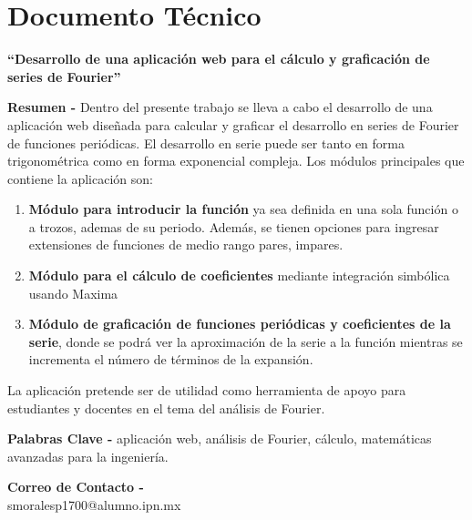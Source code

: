\chapter{Documento Técnico}
\begin{center}
	\textbf{\Large “Desarrollo de una aplicación web para el cálculo y graficación de series de Fourier”}
	\vspace{0.5cm}
\end{center}

\textbf{Resumen -} Dentro del presente trabajo se lleva a cabo el desarrollo de una aplicación web diseñada para calcular y graficar el desarrollo en series de Fourier de funciones periódicas. El desarrollo en serie puede ser tanto en forma trigonométrica como en forma exponencial compleja. Los módulos principales que contiene la aplicación son:

\begin{enumerate}
	\item \textbf{Módulo para introducir la función} ya sea definida en una sola función o a trozos, ademas de su periodo. Además, se tienen opciones para ingresar extensiones de funciones de medio rango pares, impares.
	\item \textbf{Módulo para el cálculo de coeficientes} mediante integración simbólica usando Maxima
	\item \textbf{Módulo de graficación de funciones periódicas y coeficientes de la serie}, donde se podrá ver la aproximación de la serie a la función mientras se incrementa el número de términos de la expansión.
\end{enumerate}

 La aplicación pretende ser de utilidad como herramienta de apoyo para estudiantes y docentes en el tema del análisis de Fourier.

\vspace{0.5cm}

\textbf{Palabras Clave -} aplicación web, análisis de Fourier, cálculo, matemáticas avanzadas para la ingeniería.

\vspace{0.5cm}

\textbf{Correo de Contacto -} \\
smoralesp1700@alumno.ipn.mx \\